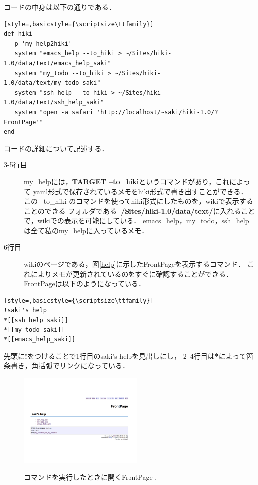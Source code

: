コードの中身は以下の通りである．
\begin{lstlisting}[style=,basicstyle={\scriptsize\ttfamily}]
def hiki
   p 'my_help2hiki'
   system "emacs_help --to_hiki > ~/Sites/hiki-1.0/data/text/emacs_help_saki"
   system "my_todo --to_hiki > ~/Sites/hiki-1.0/data/text/my_todo_saki"
   system "ssh_help --to_hiki > ~/Sites/hiki-1.0/data/text/ssh_help_saki"
   system "open -a safari 'http://localhost/~saki/hiki-1.0/?FrontPage'"
end
\end{lstlisting}

コードの詳細について記述する．
\begin{description}
\item[3-5行目]
my\_helpには，\textbf{TARGET --to\_hiki}というコマンドがあり，これによって
yaml形式で保存されているメモをhiki形式で書き出すことができる．
この --to\_hiki のコマンドを使ってhiki形式にしたものを，wikiで表示することのできる
フォルダである\textbf{~/Sites/hiki-1.0/data/text/}に入れることで，wikiでの表示を可能にしている．
emacs\_help，my\_todo，ssh\_helpは全て私のmy\_helpに入っているメモ．
\end{description}

\begin{description}
\item[6行目]
wikiのページである，図\ref{help}に示したFrontPageを表示するコマンド．
これによりメモが更新されているのをすぐに確認することができる．
FrontPageは以下のようになっている．
\end{description}

\begin{lstlisting}[style=,basicstyle={\scriptsize\ttfamily}]
!saki's help
*[[ssh_help_saki]]
*[[my_todo_saki]]
*[[emacs_help_saki]]
\end{lstlisting}
先頭に\textbf{!}をつけることで1行目のsaki's helpを見出しにし，
2~4行目は\textbf{*}によって箇条書き，角括弧でリンクになっている．
\newpage
\begin{figure}[htbp]\begin{center}
\includegraphics[clip,width=6cm,bb=100 100 600 550]{my_help2hiki_saki.002.png}
\caption{コマンドを実行したときに開くFrontPage .}\label{help}
\label{default}\end{center}\end{figure}

